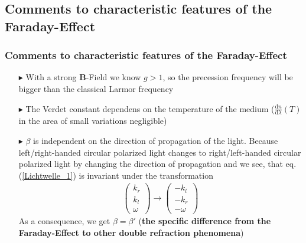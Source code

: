 \documentclass[11pt,a4paper]{beamer}
\begin{document}
\begin{frame}
\subsection{Comments to characteristic features of the Faraday-Effect}
\frametitle{Comments to characteristic features of the Faraday-Effect}
\begin{itemize}
\item[$\blacktriangleright$] With a strong \textbf{B}-Field we know $g > 1$, so the precession frequency will be bigger than the classical Larmor frequency
\item[$\blacktriangleright$] The Verdet constant dependens on the temperature of the medium ($\frac{\text{d} n}{\text{d} \lambda}(T)$ in the area of small variations negligible)
\item[$\blacktriangleright$] $\beta$ is independent on the direction of propagation of the light.
Because left/right-handed circular polarized light changes to right/left-handed circular polarized light by changing the direction of propagation and
we see, that eq. (\ref{Lichtwelle_1}) is invariant under the transformation 
\begin{align}
\begin{pmatrix}
k_r \\
k_l \\
\omega
\end{pmatrix} \rightarrow 
\begin{pmatrix}
-k_l\\
-k_r\\
-\omega
\end{pmatrix}
\end{align}
As a consequence, we get $\beta = \beta'$ \newline(\textbf{the specific difference from the Faraday-Effect to other double refraction phenomena})
\end{itemize}
\end{frame}
\end{document}
